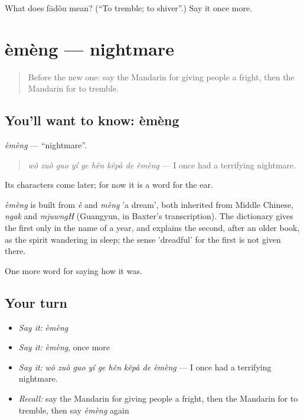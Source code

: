 \begin{tcolorbox}[breakable,colback=teal!4,colframe=teal!35!black,title={Before you move on}]
What does fādǒu mean? (\textquotedblleft{}To tremble; to shiver\textquotedblright{}.) Say it once more.
\end{tcolorbox}
\section[èmèng]{èmèng — nightmare}

\label{lesson:ZH-C463-emeng}



\begin{quote}
Before the new one: say the Mandarin for giving people a fright, then the Mandarin for to tremble.
\end{quote}

\subsection*{You'll want to know: èmèng}
\emph{èmèng} — \textquotedblleft{}nightmare\textquotedblright{}.

\begin{quote}
\emph{wǒ zuò guo yí ge hěn kěpà de èmèng} — I once had a terrifying nightmare.
\end{quote}

Its characters come later; for now it is a word for the ear.

\begin{cousinweb}
\emph{èmèng} is built from \emph{è} and \emph{mèng} 'a dream', both inherited from Middle Chinese, \emph{ngak} and \emph{mjuwngH} (Guangyun, in Baxter's transcription). The dictionary gives the first only in the name of a year, and explains the second, after an older book, as the spirit wandering in sleep; the sense 'dreadful' for the first is not given there.
\end{cousinweb}

\begin{grammarlens}[title={What you've built}]
One more word for saying how it was.
\end{grammarlens}

\subsection*{Your turn}
\begin{itemize}
\raggedright
  \item \emph{Say it:} \emph{èmèng}
  \item \emph{Say it:} \emph{èmèng}, once more
  \item \emph{Say it:} \emph{wǒ zuò guo yí ge hěn kěpà de èmèng} — I once had a terrifying nightmare.
  \item \emph{Recall:} say the Mandarin for giving people a fright, then the Mandarin for to tremble, then say \emph{èmèng} again
\end{itemize}

